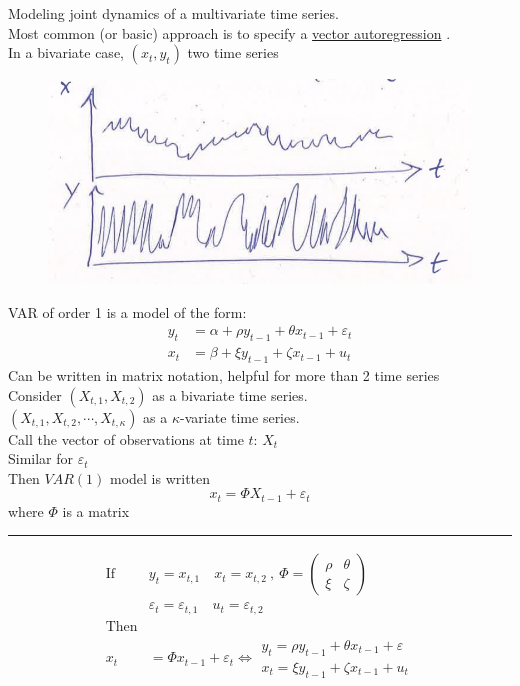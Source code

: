 Modeling joint dynamics of a multivariate time series.\\
\quad Most common (or basic) approach is to specify a \underline{vector autoregression} .\\

In a bivariate case, $(x_t,y_t) $ two time series
\begin{figure}[H]
    \centering
    \includegraphics[width=0.75\linewidth]{images/Screenshot 2024-05-21 at 18.18.51.jpg}
\end{figure}

VAR of order 1 is a model of the form: 
\begin{align*}
    y_t&= \alpha+\rho y_{t-1} + \theta x_{t-1} + \varepsilon_t\\
    x_t&= \beta + \xi y_{t-1} + \zeta x_{t-1} + u_t
\end{align*}
Can be written in matrix notation, helpful for more than 2 time series\\
Consider $(X_{t,1}, X_{t,2})$ as a bivariate time series. \\
$(X_{t,1}, X_{t,2},\cdots,X_{t,\kappa})$ as a $\kappa$-variate time series. \\

Call the vector of observations at time $t$: $X_t$ \\
Similar for $\varepsilon_t$ \\
Then $VAR(1)$ model is written \[
    x_t= \Phi X_{t-1} + \varepsilon_t
\] \quad where $\Phi$ is a matrix

\noindent
\rule{\linewidth}{0.4pt}
\begin{align*}
    \text{If } &y_t = x_{t,1}  \quad x_t = x_{t,2} \ ,\  \Phi = \begin{pmatrix}
\rho & \theta \\
\xi & \zeta 
\end{pmatrix} \\
&\varepsilon_t = \varepsilon_{t,1}  \quad u_t = \varepsilon_{t,2} \\
\text{Then} \\
x_t&= \Phi x_{t-1}+ \varepsilon_t \Leftrightarrow \begin{matrix}
    y_t=\rho y_{t-1} + \theta x_{t-1} + \varepsilon \\
    x_t = \xi y_{t-1} + \zeta x_{t-1} + u_t
\end{matrix}
\end{align*}

